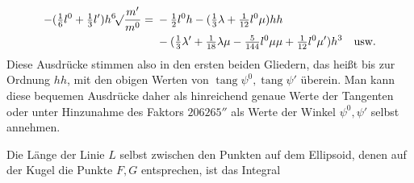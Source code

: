 \[
\begin{aligned}
-(\tfrac{1}{6}l^0+\tfrac{1}{3}l')h\BareRoot[6]{\frac{m'}{m^0}}={}&-\tfrac{1}{2}l^0h-(\tfrac{1}{3}\lambda+\tfrac{1}{12}l^0\mu)hh\\
&-(\tfrac{1}{3}\lambda'+\tfrac{1}{18}\lambda\mu-\tfrac{5}{144}l^0\mu\mu+\tfrac{1}{12}l^0\mu')h^3\quad\text{usw.}
\end{aligned}
\]
Diese Ausdrücke stimmen also in den ersten beiden Gliedern, das heißt bis zur Ordnung \(hh\), mit den obigen Werten von \(\operatorname{tang}\psi^0,\operatorname{tang}\psi'\) überein. Man kann diese bequemen Ausdrücke daher als hinreichend genaue Werte der Tangenten oder unter Hinzunahme des Faktors \(206265''\) als Werte der Winkel \(\psi^0,\psi'\) selbst annehmen.

Die Länge der Linie \(L\) selbst zwischen den Punkten auf dem Ellipsoid, denen auf der Kugel die Punkte \(F,G\) entsprechen, ist das Integral
